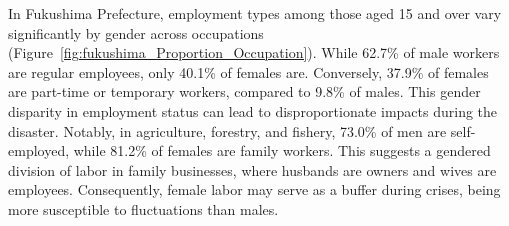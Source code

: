 \documentclass[a4paper,12pt]{article}
\begin{document}
In Fukushima Prefecture, employment types among those aged 15 and over vary significantly by gender across occupations (Figure~\ref{fig:fukushima_Proportion_Occupation}). While 62.7\% of male workers are regular employees, only 40.1\% of females are. Conversely, 37.9\% of females are part-time or temporary workers, compared to 9.8\% of males. This gender disparity in employment status can lead to disproportionate impacts during the disaster. Notably, in agriculture, forestry, and fishery, 73.0\% of men are self-employed, while 81.2\% of females are family workers. This suggests a gendered division of labor in family businesses, where husbands are owners and wives are employees. Consequently, female labor may serve as a buffer during crises, being more susceptible to fluctuations than males.

\end{document}
